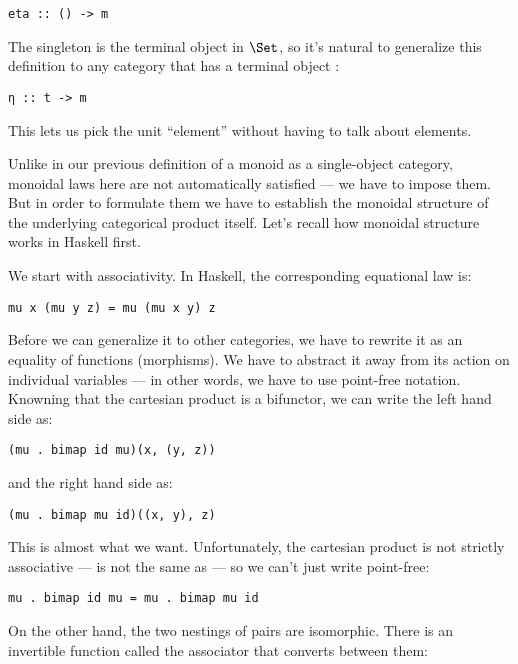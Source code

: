 \begin{Verbatim}[commandchars=\\\{\}]
eta :: () -> m
\end{Verbatim}
The singleton is the terminal object in $\Set$, so it's natural to
generalize this definition to any category that has a terminal object
:

\begin{Verbatim}[commandchars=\\\{\}]
η :: t -> m
\end{Verbatim}
This lets us pick the unit ``element'' without having to talk about
elements.

Unlike in our previous definition of a monoid as a single-object
category, monoidal laws here are not automatically satisfied --- we have
to impose them. But in order to formulate them we have to establish the
monoidal structure of the underlying categorical product itself. Let's
recall how monoidal structure works in Haskell first.

We start with associativity. In Haskell, the corresponding equational
law is:

\begin{Verbatim}[commandchars=\\\{\}]
mu x (mu y z) = mu (mu x y) z
\end{Verbatim}
Before we can generalize it to other categories, we have to rewrite it
as an equality of functions (morphisms). We have to abstract it away
from its action on individual variables --- in other words, we have to
use point-free notation. Knowning that the cartesian product is a
bifunctor, we can write the left hand side as:

\begin{Verbatim}[commandchars=\\\{\}]
(mu . bimap id mu)(x, (y, z))
\end{Verbatim}
and the right hand side as:

\begin{Verbatim}[commandchars=\\\{\}]
(mu . bimap mu id)((x, y), z)
\end{Verbatim}
This is almost what we want. Unfortunately, the cartesian product is not
strictly associative ---  is not the same as
 --- so we can't just write point-free:

\begin{Verbatim}[commandchars=\\\{\}]
mu . bimap id mu = mu . bimap mu id
\end{Verbatim}
On the other hand, the two nestings of pairs are isomorphic. There is an
invertible function called the associator that converts between them:


